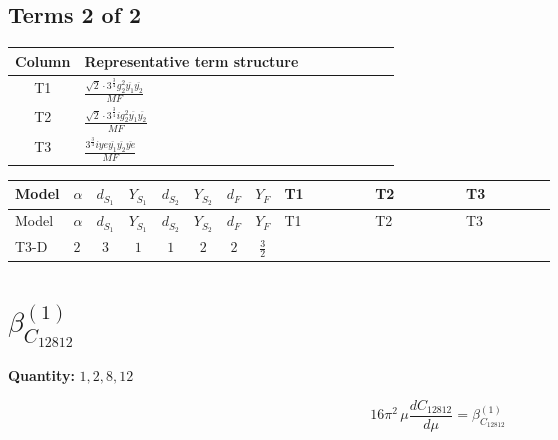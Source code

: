 \documentclass[8pt]{article}
\begin{document}
\begin{landscape}
\subsection*{Terms 2 of 2}
\begin{center}
\begin{tabular}{@{}c >{\raggedright\arraybackslash}p{0.82\linewidth}@{}}
\toprule
Column & Representative term structure \\
\midrule
T1 & \(\displaystyle \frac{\sqrt{2} \cdot 3^{\frac{3}{4}} g_{2}^{2} \overline{y_{1}} \overline{y_{2}}}{MF}\) \\
\midrule
T2 & \(\displaystyle \frac{\sqrt{2} \cdot 3^{\frac{3}{4}} i g_{2}^{2} \overline{y_{1}} \overline{y_{2}}}{MF}\) \\
\midrule
T3 & \(\displaystyle \frac{3^{\frac{3}{4}} i ye \overline{y_{1}} \overline{y_{2}} \overline{ye}}{MF}\) \\
\midrule
\bottomrule
\end{tabular}
\end{center}
\smallskip
\tiny
\begin{longtable}{@{}llcccccc >{\raggedright\arraybackslash}p{0.21\linewidth} >{\raggedright\arraybackslash}p{0.21\linewidth} >{\raggedright\arraybackslash}p{0.21\linewidth}@{}}
\toprule
Model & $\alpha$ & $d_{S_1}$ & $Y_{S_1}$ & $d_{S_2}$ & $Y_{S_2}$ & $d_F$ & $Y_F$ & T1 & T2 & T3 \\
\midrule
\endfirsthead
\toprule
Model & $\alpha$ & $d_{S_1}$ & $Y_{S_1}$ & $d_{S_2}$ & $Y_{S_2}$ & $d_F$ & $Y_F$ & T1 & T2 & T3 \\
\midrule
\endhead
T3-D & $2$ & $3$ & $1$ & $1$ & $2$ & $2$ & $\frac{3}{2}$ & \scriptsize\adjustbox{max width=\linewidth}{$\begin{gathered} \frac{\sqrt{2} \cdot 3^{\frac{3}{4}} g_{2}^{2} \overline{y_{1}} \overline{y_{2}}}{6 MF}\end{gathered}$} & \scriptsize\adjustbox{max width=\linewidth}{$\begin{gathered} - \frac{\sqrt{2} \cdot 3^{\frac{3}{4}} i g_{2}^{2} \overline{y_{1}} \overline{y_{2}}}{6 MF}\end{gathered}$} & \scriptsize\adjustbox{max width=\linewidth}{$\begin{gathered} \frac{3^{\frac{3}{4}} i ye \overline{y_{1}} \overline{y_{2}} \overline{ye}}{12 MF}\end{gathered}$} \\
\midrule
\bottomrule
\end{longtable}
\clearpage
\section*{$\beta_{C_{12812}}^{(1)}$}
\noindent\textbf{Quantity: }$\mathrm{1,2,8,12}$\par\smallskip
\[16\pi^2\,\mu\frac{d C_{12812}}{d\mu}=\beta_{C_{12812}}^{(1)}\]

\end{landscape}
\end{document}
